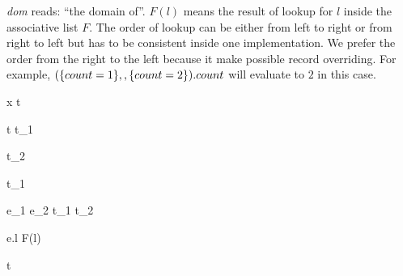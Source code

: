 \textit{dom} reads: ``the domain of''. $ F(l) $ means the result of lookup for
$ l $ inside the associative list $ F $. The order of lookup can be either from
left to right or from right to left but has to be consistent inside one
implementation. We prefer the order from the right to the left because it make
possible record overriding. For example,
$ (\{ count = 1 \} ,, \{ count = 2 \}).count $ will evaluate to
$ 2 $ in this case.


{\typing {\Gamma} {x} {t}}

{\typing {\Gamma} {} {t \to t_1}}

{\typing {\Gamma} {} {}}

{\typing {\Gamma} {} {t_2}}

{\typing {\Gamma} {} { t_1}}

{\typing {\Gamma} {e_1 \dcomma e_2} {t_1 \with t_2}}

{\typing {\Gamma} {} {}}

{\typing {\Gamma} {e.l} {F(l)}}

{\typing {\Gamma} {} {t}}